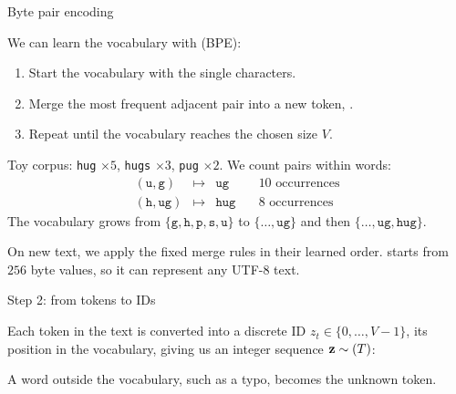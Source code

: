 \begin{frame}{Byte pair encoding}
    \setlength{\parskip}{3pt}
    \setlength{\abovedisplayskip}{5pt}
    \setlength{\belowdisplayskip}{5pt}

    We can learn the vocabulary with  (BPE):
    \begin{enumerate}
        \item Start the vocabulary with the single characters.
        \item Merge the most frequent adjacent pair into a new token, .
        \item Repeat until the vocabulary reaches the chosen size $V$.
    \end{enumerate}

    Toy corpus: \texttt{hug} $\times5$, \texttt{hugs} $\times3$,
    \texttt{pug} $\times2$. We count pairs within words:
    \[
        \begin{array}{rcll}
            (\texttt{u},\texttt{g})  & \longmapsto & \texttt{ug}  & \quad 10\text{ occurrences} \\
            (\texttt{h},\texttt{ug}) & \longmapsto & \texttt{hug} & \quad 8\text{ occurrences}
        \end{array}
    \]
    The vocabulary grows from $\{\texttt{g},\texttt{h},\texttt{p},\texttt{s},\texttt{u}\}$
    to $\{\ldots,\texttt{ug}\}$ and then $\{\ldots,\texttt{ug},\texttt{hug}\}$.

    On new text, we apply the fixed merge rules in their learned order.
     starts from $256$ byte values, so it can represent
    any UTF-8 text.


\end{frame}

\begin{whiteframe}{Step 2: from tokens to IDs}
    \setlength{\parskip}{4pt}

    Each token in the text is converted into a discrete ID
    $z_t\in\{0,\ldots,V-1\}$, its position in the vocabulary, giving us an
    integer sequence $\boldsymbol{\mathbf{z}}\sim(T)$:

    \begin{center}
        
    \end{center}

    A word outside the vocabulary, such as a typo, becomes the unknown token.

\end{whiteframe}

